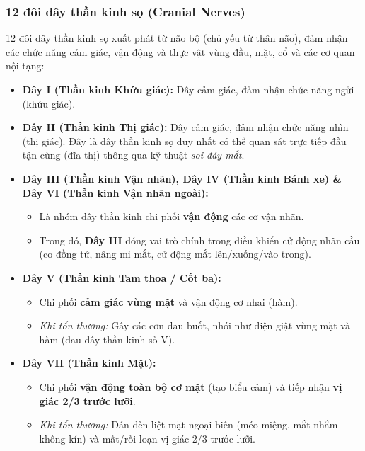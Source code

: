 \subsubsection{12 đôi dây thần kinh sọ (Cranial Nerves)}

12 đôi dây thần kinh sọ xuất phát từ não bộ (chủ yếu từ thân não), đảm nhận các chức năng cảm giác, vận động và thực vật vùng đầu, mặt, cổ và các cơ quan nội tạng:

\begin{itemize}
    \item \textbf{Dây I (Thần kinh Khứu giác):} Dây cảm giác, đảm nhận chức năng ngửi (khứu giác).
    
    \item \textbf{Dây II (Thần kinh Thị giác):} Dây cảm giác, đảm nhận chức năng nhìn (thị giác). Đây là dây thần kinh sọ duy nhất có thể quan sát trực tiếp đầu tận cùng (đĩa thị) thông qua kỹ thuật \textit{soi đáy mắt}.
    
    \item \textbf{Dây III (Thần kinh Vận nhãn), Dây IV (Thần kinh Bánh xe) \& Dây VI (Thần kinh Vận nhãn ngoài):} 
    \begin{itemize}
        \item Là nhóm dây thần kinh chi phối \textbf{vận động} các cơ vận nhãn.
        \item Trong đó, \textbf{Dây III} đóng vai trò chính trong điều khiển cử động nhãn cầu (co đồng tử, nâng mi mắt, cử động mắt lên/xuống/vào trong).
    \end{itemize}

    \item \textbf{Dây V (Thần kinh Tam thoa / Cốt ba):} 
    \begin{itemize}
        \item Chi phối \textbf{cảm giác vùng mặt} và vận động cơ nhai (hàm).
        \item \textit{Khi tổn thương:} Gây các cơn đau buốt, nhói như điện giật vùng mặt và hàm (đau dây thần kinh số V).
    \end{itemize}

    \item \textbf{Dây VII (Thần kinh Mặt):} 
    \begin{itemize}
        \item Chi phối \textbf{vận động toàn bộ cơ mặt} (tạo biểu cảm) và tiếp nhận \textbf{vị giác 2/3 trước lưỡi}.
        \item \textit{Khi tổn thương:} Dẫn đến liệt mặt ngoại biên (méo miệng, mắt nhắm không kín) và mất/rối loạn vị giác 2/3 trước lưỡi.
    \end{itemize}


\end{itemize}
